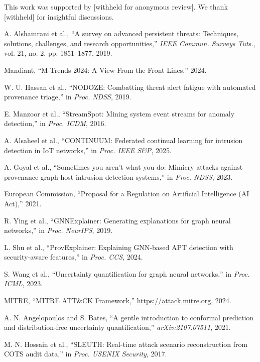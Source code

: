 \documentclass[conference]{IEEEtran}
\begin{document}
This work was supported by [withheld for anonymous review]. We thank [withheld] for insightful discussions.


\begin{thebibliography}{99}

A. Alshamrani et al., ``A survey on advanced persistent threats: Techniques, solutions, challenges, and research opportunities,'' \emph{IEEE Commun. Surveys Tuts.}, vol. 21, no. 2, pp. 1851--1877, 2019.

Mandiant, ``M-Trends 2024: A View From the Front Lines,'' 2024.

W. U. Hassan et al., ``NODOZE: Combatting threat alert fatigue with automated provenance triage,'' in \emph{Proc. NDSS}, 2019.

E. Manzoor et al., ``StreamSpot: Mining system event streams for anomaly detection,'' in \emph{Proc. ICDM}, 2016.

A. Alsaheel et al., ``CONTINUUM: Federated continual learning for intrusion detection in IoT networks,'' in \emph{Proc. IEEE S\&P}, 2025.

A. Goyal et al., ``Sometimes you aren't what you do: Mimicry attacks against provenance graph host intrusion detection systems,'' in \emph{Proc. NDSS}, 2023.

European Commission, ``Proposal for a Regulation on Artificial Intelligence (AI Act),'' 2021.

R. Ying et al., ``GNNExplainer: Generating explanations for graph neural networks,'' in \emph{Proc. NeurIPS}, 2019.

L. Shu et al., ``ProvExplainer: Explaining GNN-based APT detection with security-aware features,'' in \emph{Proc. CCS}, 2024.

S. Wang et al., ``Uncertainty quantification for graph neural networks,'' in \emph{Proc. ICML}, 2023.

MITRE, ``MITRE ATT\&CK Framework,'' \url{https://attack.mitre.org}, 2024.

A. N. Angelopoulos and S. Bates, ``A gentle introduction to conformal prediction and distribution-free uncertainty quantification,'' \emph{arXiv:2107.07511}, 2021.

M. N. Hossain et al., ``SLEUTH: Real-time attack scenario reconstruction from COTS audit data,'' in \emph{Proc. USENIX Security}, 2017.


\end{thebibliography}
\end{document}
